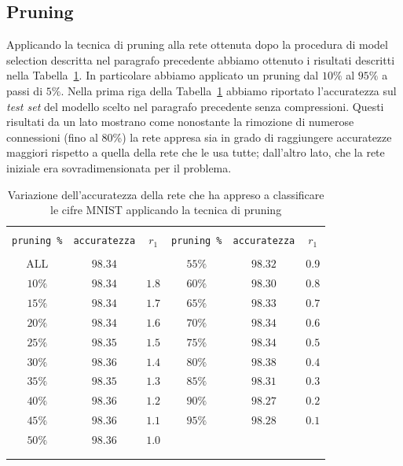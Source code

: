 \documentclass[11pt,a4paper,twoside,
openright]{book}
\begin{document}
\subsection{Pruning}
\label{pruningmnist}
Applicando la tecnica di pruning alla rete ottenuta dopo la procedura di model selection descritta nel paragrafo precedente abbiamo ottenuto i risultati descritti nella Tabella~\ref{tab:tabprmnist}. In particolare abbiamo applicato un pruning dal $10\%$ al $95\%$ a passi di $5\%$. Nella prima riga della Tabella~\ref{tab:tabprmnist} abbiamo riportato l'accuratezza sul \textit{test set} del modello scelto nel paragrafo precedente senza compressioni. Questi risultati da un lato mostrano come nonostante la rimozione di numerose connessioni (fino al 80\%) la rete appresa sia in grado di raggiungere accuratezze maggiori rispetto a quella della rete che le usa tutte; dall'altro lato, che la rete iniziale era sovradimensionata per il problema.
\vspace*{\fill}
\begin{center}
\begin{table}[]
  \small
  \caption{Variazione dell'accuratezza della rete che ha appreso a classificare le cifre MNIST applicando la tecnica di pruning}\label{tab:tabprmnist}
\begin{center}
\begin{tabular}{ccc|ccc}

\hline\\[-11pt]

\hline\\[-11pt]
\texttt{pruning \%} & \texttt{accuratezza} & $r_1$ & \texttt{pruning \%} & \texttt{accuratezza} & $r_1$ \\[1pt]
\hline\\[-6.5pt]
ALL    & $98.34$ &    & $55\%$ & $98.32$ & 0.9\\ 
$10\%$ & $98.34$ &$1.8$ & $60\%$ & $98.30$ & $0.8$\\ 
$15\%$ & $98.34$ &$1.7$ & $65\%$ & $98.33$ & $0.7$\\ 
$20\%$ & $98.34$ &$1.6$ & $70\%$ & $98.34$ & $0.6$\\ 
$25\%$ & $98.35$ &$1.5$ & $75\%$ & $98.34$ & $0.5$\\ 
$30\%$ & $98.36$ &$1.4$ & $80\%$ & $98.38$ & $0.4$\\ 
$35\%$ & $98.35$ &$1.3$ & $85\%$ & $98.31$ & $0.3$\\ 
$40\%$ & $98.36$ &$1.2$ & $90\%$ & $98.27$ & $0.2$\\ 
$45\%$ & $98.36$ &$1.1$ & $95\%$ & $98.28$ & $0.1$\\ 
$50\%$ & $98.36$ &$1.0$&&&\\  
\hline\\[-11pt]
\hline\\[-8pt]
\end{tabular}\\[5pt]
\end{center}
\normalsize
\end{table}
\end{center}
\end{document}
